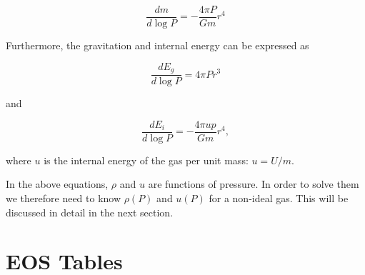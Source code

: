 \documentclass[apj]{emulateapj}
\begin{document}
\begin{equation}
\label{eq:dmdp}
\frac{dm}{d \log P} = -\frac{4 \pi P}{G m} r^4
\end{equation}

Furthermore, the gravitation and internal energy can be expressed as 

\begin{equation}
\label{eq:degdp}
\frac{d E_g}{d \log P} = 4 \pi P r^3
\end{equation}

\noindent and

\begin{equation}
\label{eq:deidp}
\frac{d E_i}{d \log P} = - \frac{4 \pi u p}{G m} r^4,
\end{equation}

\noindent where $u$ is the internal energy of the gas per unit mass: $u = U/m$.


%
%
%
%
%
%

In the above equations, $\rho$ and $u$ are functions of pressure. In order to solve them we therefore need to know $\rho(P)$ and $u(P)$ for a non-ideal gas. This will be discussed in detail in the next section.

\section{EOS Tables}
\end{document}

